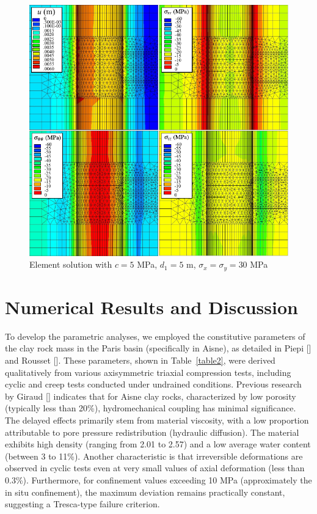 \documentclass[a4paper,fleqn]{cas-sc}
\begin{document}
\begin{figure}[h!]
	\centering
	\includegraphics[scale=1]{MA_FIG2.pdf}
	\caption{Element solution with $c=5$ MPa, $d_1=5$ m, $\sigma_x = \sigma_y = 30$ MPa}
	\label{MA_FIG2}
\end{figure}
\FloatBarrier

\section{Numerical Results and Discussion}\label{}


To develop the parametric analyses, we employed the constitutive parameters of the clay rock mass in the Paris basin (specifically in Aisne), as detailed in Piepi [] and Rousset []. These parameters, shown in Table~\ref{table2}, were derived qualitatively from various axisymmetric triaxial compression tests, including cyclic and creep tests conducted under undrained conditions. Previous research by Giraud [] indicates that for Aisne clay rocks, characterized by low porosity (typically less than 20\%), hydromechanical coupling has minimal significance. The delayed effects primarily stem from material viscosity, with a low proportion attributable to pore pressure redistribution (hydraulic diffusion). The material exhibits high density (ranging from 2.01 to 2.57) and a low average water content (between 3 to 11\%). Another characteristic is that irreversible deformations are observed in cyclic tests even at very small values of axial deformation (less than 0.3\%). Furthermore, for confinement values exceeding 10 MPa (approximately the in situ confinement), the maximum deviation remains practically constant, suggesting a Tresca-type failure criterion.
\end{document}
